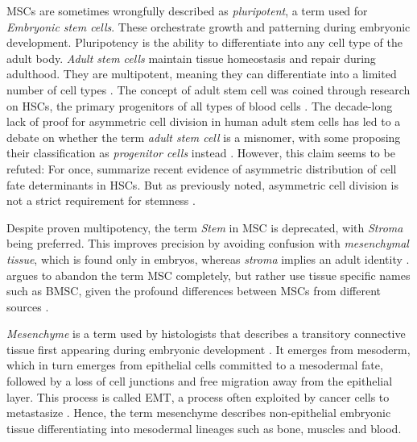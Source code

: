 \acp{MSC} are sometimes wrongfully described as \emph{pluripotent}, a term
used for \emph{Embryonic stem cells}. These orchestrate growth and
patterning during embryonic development. Pluripotency is the ability to
differentiate into any cell type of the adult body. \emph{Adult stem cells}
 maintain tissue homeostasis and
repair during adulthood. They are multipotent, meaning they can differentiate
into a limited number of cell types . The
concept of adult stem cell was coined through research on \acp{HSC}, the primary
progenitors of all types of blood cells \cite{leeHematopoieticStemCells2019,
    nunesAsymmetricCellDivision2024}. The decade-long lack of proof for asymmetric
cell division in human adult stem cells has led to a debate on whether the term
\emph{adult stem cell} is a misnomer, with some proposing their classification
as \emph{progenitor cells} instead \cite{bhartiyaStemCellsProgenitors2015}.
However, this claim seems to be refuted: For once,
\citet{nunesAsymmetricCellDivision2024} summarize recent evidence of asymmetric
distribution of cell fate determinants in \acp{HSC}. But as previously noted,
asymmetric cell division is not a strict requirement for stemness
\cite{shahriyariSymmetricVsAsymmetric2013}.

Despite proven multipotency, the term \emph{Stem} in \ac{MSC} is deprecated,
with \emph{Stroma} being preferred. This improves precision by avoiding
confusion with \emph{mesenchymal tissue}, which is found only in embryos,
whereas \emph{stroma} implies an adult identity
\cite{robeyMesenchymalStemCells2017}. \citet{robeyMesenchymalStemCells2017}
argues to abandon the term MSC completely, but rather use tissue specific names
such as \ac{BMSC}, given the profound differences between MSCs from different
sources \cite{jansenFunctionalDifferencesMesenchymal2010,
    sacchettiNoIdenticalMesenchymal2016}.


\emph{Mesenchyme} is a term used by histologists that describes a transitory
connective tissue first appearing during embryonic development
\cite{robeyMesenchymalStemCells2017}. It emerges from mesoderm, which in turn
emerges from epithelial cells committed to a mesodermal fate, followed by a loss
of cell junctions and free migration away from the epithelial layer. This
process is called \acf{EMT}, a process often exploited by cancer cells to
metastasize \cite{tamFormationMesodermalTissues1987,
    nowotschinCellularDynamicsEarly2010}. Hence, the term mesenchyme describes
non-epithelial embryonic tissue differentiating into mesodermal lineages such as
bone, muscles and blood.

